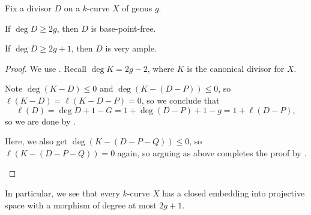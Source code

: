 \documentclass[../notes.tex]{subfiles}
\begin{document}
\begin{corollary} \label{cor:big-is-very-ample}
	Fix a divisor $D$ on a $k$-curve $X$ of genus $g$.
	\begin{listalph}
		\item If $\deg D\ge2g$, then $D$ is base-point-free.
		\item If $\deg D\ge2g+1$, then $D$ is very ample.
	\end{listalph}
\end{corollary}
\begin{proof}
	We use . Recall $\deg K=2g-2$, where $K$ is the canonical divisor for $X$.
	\begin{listalph}
		\item Note $\deg(K-D)\le0$ and $\deg(K-(D-P))\le0$, so $\ell(K-D)=\ell(K-D-P)=0$, so we conclude that
		\[\ell(D)=\deg D+1-G=1+\deg(D-P)+1-g=1+\ell(D-P),\]
		so we are done by .
		\item Here, we also get $\deg(K-(D-P-Q))\le0$, so $\ell(K-(D-P-Q))=0$ again, so arguing as above completes the proof by .
		\qedhere
	\end{listalph}
\end{proof}
In particular, we see that every $k$-curve $X$ has a closed embedding into projective space with a morphism of degree at most $2g+1$.
\end{document}
